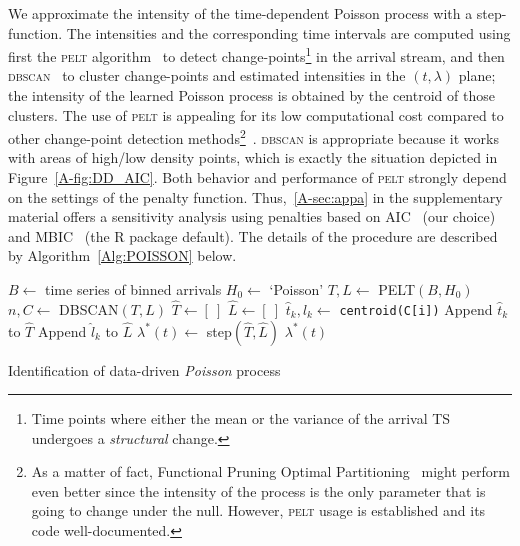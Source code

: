 \documentclass[]{elsarticle}
\newcommand{\PELT}{\textsc{pelt}}
\newcommand{\DBSCAN}{\textsc{dbscan}}
\begin{document}
We approximate the intensity of the time-dependent Poisson process with a step-function.
The intensities and the corresponding time intervals are computed using first the \PELT{} algorithm~\citep{killick2012optimal} to detect change-points\footnote{Time points where either the mean or the variance of the arrival \ac{TS} undergoes a \emph{structural} change.} in the arrival stream, and then \DBSCAN{}~\citep{ester1996density,pedregosa2011scikit} to cluster change-points and estimated intensities in the \((t, \lambda)\) plane; the intensity of the learned Poisson process is obtained by the centroid of those clusters.
The use of \PELT{} is appealing for its low computational cost compared to other change-point detection methods\footnote{As a matter of fact, Functional Pruning Optimal Partitioning~\citep{maidstone2017} might perform even better since the intensity of the process is the only parameter that is going to change under the null.
However, \PELT{} usage is established and its code well-documented.}~\citep{killick2012optimal}.
\DBSCAN{} is appropriate because it works with areas of high/low density points, which is exactly the situation depicted in Figure~\ref{A-fig:DD_AIC}.
Both behavior and performance of \PELT{} strongly depend on the settings of the penalty function.
Thus,~\ref{A-sec:appa} in the supplementary material offers a sensitivity analysis using penalties based on  \ac{AIC}~\citep{akaike1973information} (our choice) and \ac{MBIC}~\citep{zhang2007modified} (the R package default).
The details of the procedure are described by Algorithm~\ref{Alg:POISSON} below.


\begin{algorithm}
\begin{algorithmic}[1]
    \STATE \(B \leftarrow \) time series of binned arrivals
    \STATE \(H_0 \leftarrow \) `Poisson'
    \STATE \(T, L \leftarrow \) PELT\((B, H_0)\)
    \STATE \(n, C \leftarrow \) DBSCAN\((T, L)\)
    \STATE {}
    \STATE \(\hat{T} \leftarrow [~] \)
    \STATE \(\hat{L} \leftarrow [~] \)
        \STATE \(\hat{t}_k, \hat{l}_k \leftarrow \) \texttt{centroid(C[i])}
        \STATE Append \(\hat{t}_k\) to \(\hat{T}\)
        \STATE Append \(\hat{l}_k\) to \(\hat{L}\)
    \ENDFOR
    \STATE \(\lambda^\ast(t) \leftarrow \) step\((\hat{T}, \hat{L})\)
    \RETURN \(\lambda^\ast(t)\)
\end{algorithmic}
\caption{Identification of data-driven \emph{Poisson} process}\label{Alg:POISSON}
\end{algorithm}
\end{document}
